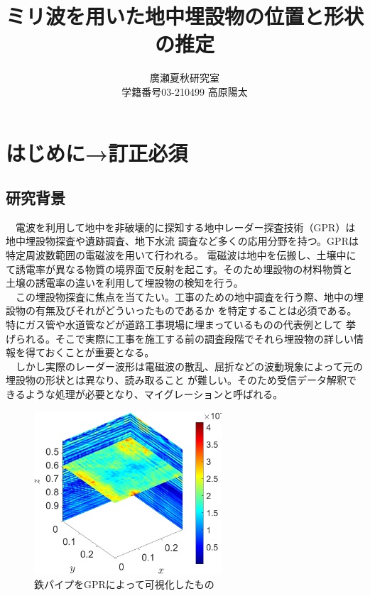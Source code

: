 \documentclass[a4paper,12pt]{jsreport}
\title{ミリ波を用いた地中埋設物の位置と形状の推定}
\author{廣瀬夏秋研究室\\
学籍番号03-210499 高原陽太}
\begin{document}
\maketitle
\tableofcontents
\clearpage
\chapter{はじめに→訂正必須}
\section{研究背景}
　電波を利用して地中を非破壊的に探知する地中レーダー探査技術（GPR）は地中埋設物探査や遺跡調査、地下水流
調査など多くの応用分野を持つ\cite{radar1}\cite{radar2}。GPRは特定周波数範囲の電磁波を用いて行われる。
電磁波は地中を伝搬し、土壌中にて誘電率が異なる物質の境界面で反射を起こす。そのため埋設物の材料物質と
土壌の誘電率の違いを利用して埋設物の検知を行う。
\\　この埋設物探査に焦点を当てたい。工事のための地中調査を行う際、地中の埋設物の有無及びそれがどういったものであるか
を特定することは必須である。特にガス管や水道管などが道路工事現場に埋まっているものの代表例として
挙げられる。そこで実際に工事を施工する前の調査段階でそれら埋設物の詳しい情報を得ておくことが重要となる。
\\　しかし実際のレーダー波形は電磁波の散乱、屈折などの波動現象によって元の埋設物の形状とは異なり、読み取ること
が難しい。そのため受信データ解釈できるような処理が必要となり、マイグレーションと呼ばれる。


\begin{figure}[h]
  \begin{center}
   \includegraphics[width=7cm]{./image/0918.png}
   
  \caption{鉄パイプをGPRによって可視化したもの}\label{鉄パイプをGPRによって可視化したもの}
  \end{center}
  \end{figure}
\end{document}
